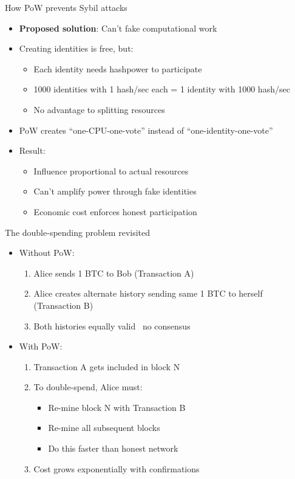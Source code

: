 \documentclass[aspectratio=169, lualatex, handout]{beamer}
\begin{document}
\begin{frame}{How PoW prevents Sybil attacks}
	\begin{itemize}
		\item \textbf{Proposed solution}: Can't fake computational work
		\item Creating identities is free, but:
		      \begin{itemize}
			      \item Each identity needs hashpower to participate
			      \item 1000 identities with 1 hash/sec each = 1 identity with 1000 hash/sec
			      \item No advantage to splitting resources
		      \end{itemize}
		\item PoW creates ``one-CPU-one-vote'' instead of ``one-identity-one-vote''
		\item Result:
		      \begin{itemize}
			      \item Influence proportional to actual resources
			      \item Can't amplify power through fake identities
			      \item Economic cost enforces honest participation
		      \end{itemize}
	\end{itemize}
\end{frame}

\begin{frame}{The double-spending problem revisited}
	\begin{itemize}
		\item Without PoW:
		      \begin{enumerate}
			      \item Alice sends 1 BTC to Bob (Transaction A)
			      \item Alice creates alternate history sending same 1 BTC to herself (Transaction B)
			      \item Both histories equally valid \rightarrow\ no consensus
		      \end{enumerate}
		\item With PoW:
		      \begin{enumerate}
			      \item Transaction A gets included in block N
			      \item To double-spend, Alice must:
			            \begin{itemize}
				            \item Re-mine block N with Transaction B
				            \item Re-mine all subsequent blocks
				            \item Do this faster than honest network
			            \end{itemize}
			      \item Cost grows exponentially with confirmations
		      \end{enumerate}
	\end{itemize}
\end{frame}
\end{document}

